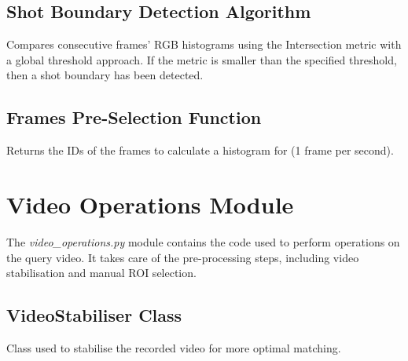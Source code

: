
\subsection{Shot Boundary Detection Algorithm}
\label{sec:code-shot_boundary_detection}

Compares consecutive frames' RGB histograms using the Intersection metric with a global threshold approach. If the metric is smaller than the specified threshold, then a shot boundary has been detected.




\subsection{Frames Pre-Selection Function}
\label{sec:code-get_frames_to_process}

Returns the IDs of the frames to calculate a histogram for (1 frame per second).




\clearpage
\section{Video Operations Module}

The \textit{video\_operations.py} module contains the code used to perform operations on the query video. It takes care of the pre-processing steps, including video stabilisation and manual ROI selection. 


\subsection{VideoStabiliser Class}
\label{sec:code-VideoStabiliser}

Class used to stabilise the recorded video for more optimal matching.



